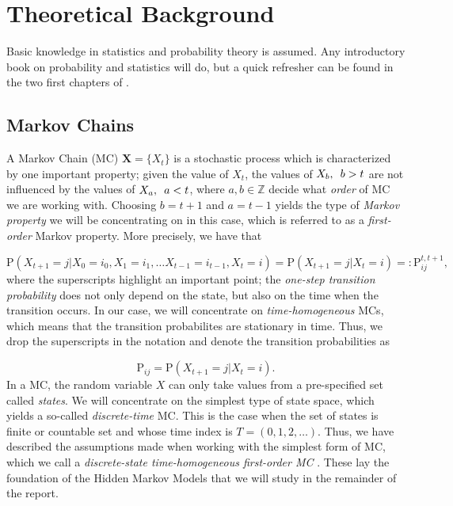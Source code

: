 \documentclass{article}
\begin{document}
\section{Theoretical Background}

Basic knowledge in statistics and probability theory is assumed. Any introductory book on probability and statistics will do, but a quick refresher can be found in the two first chapters of \cite{Pinsky2011}.

\subsection{Markov Chains}
A Markov Chain (MC) $\mathbf{X} = \{X_t\}$ is a stochastic process which is characterized by one important property; given the value of $X_t$, the values of $X_b, \hspace{0.5em} b > t$ are not influenced by the values of $X_a, \hspace{0.5em} a < t$, where $a,b \in \mathbb{Z}$ decide what \textit{order} of MC we are working with. Choosing $b = t+1$ and $a = t-1$ yields the type of \textit{Markov property} we will be concentrating on in this case, which is referred to as a \textit{first-order} Markov property. More precisely, we have that 

\begin{equation*}
     \text{P}(X_{t+1} = j|X_0 = i_0, X_1 = i_1, \ldots X_{t-1} = i_{t-1}, X_t = i) = \text{P}(X_{t+1} = j|X_t = i) =: \text{P}_{ij}^{t, t+1}, 
\end{equation*}
where the superscripts highlight an important point; the \textit{one-step transition probability} does not only depend on the state, but also on the time when the transition occurs. In our case, we will concentrate on \textit{time-homogeneous} MCs, which means that the transition probabilites are stationary in time. Thus, we drop the superscripts in the notation and denote the transition probabilities as 

\begin{equation*}
    \text{P}_{ij} = \text{P}(X_{t+1} = j|X_t = i).
\end{equation*}
In a MC, the random variable $X$ can only take values from a pre-specified set called \textit{states}. We will concentrate on the simplest type of state space, which yields a so-called \textit{discrete-time} MC. This is the case when the set of states is finite or countable set and whose time index is $T = (0,1,2,\ldots)$. Thus, we have described the assumptions made when working with the simplest form of MC, which we call a \textit{discrete-state time-homogeneous first-order MC} \cite{Pinsky2011}. These lay the foundation of the Hidden Markov Models that we will study in the remainder of the report. 
\end{document}
